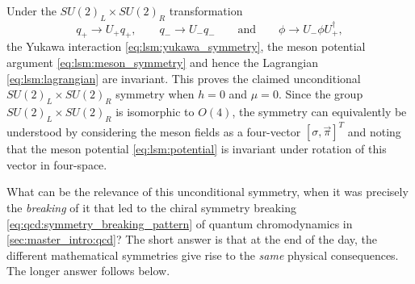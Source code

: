 Under the $SU(2)_L \times SU(2)_R$ transformation 
\begin{equation}
	q_+ \rightarrow U_+ q_+, \qquad
	q_- \rightarrow U_- q_-
	\qquad \text{and} \qquad
	\phi   \rightarrow U_- \phi U_+^\dagger,
\label{eq:lsm:symmetry_transformation}
\end{equation}
the Yukawa interaction \eqref{eq:lsm:yukawa_symmetry},
the meson potential argument \eqref{eq:lsm:meson_symmetry}
and hence the Lagrangian \eqref{eq:lsm:lagrangian} are invariant.
This proves the claimed unconditional $SU(2)_L \times SU(2)_R$ symmetry when $h=0$ and $\mu=0$.
Since the group $SU(2)_L \times SU(2)_R$ is isomorphic to $O(4)$,
the symmetry can equivalently be understood by considering the meson fields as a four-vector $[\sigma, \vec{\pi}]^T$
and noting that the meson potential \eqref{eq:lsm:potential} is invariant under rotation of this vector in four-space.

What can be the relevance of this unconditional symmetry,
when it was precisely the \emph{breaking} of it that led to the chiral symmetry breaking \eqref{eq:qcd:symmetry_breaking_pattern} of quantum chromodynamics in \cref{sec:master_intro:qcd}?
The short answer is that at the end of the day,
the different mathematical symmetries give rise to the \emph{same} physical consequences.
The longer answer follows below.

